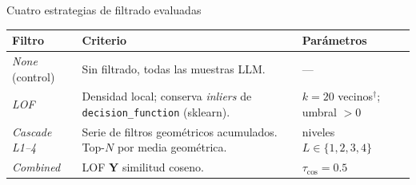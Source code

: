 \begin{frame}{Cuatro estrategias de filtrado evaluadas}
\small
\begin{tabular}{@{}p{2.6cm}p{4.6cm}p{4.6cm}@{}}
\toprule
\textbf{Filtro} & \textbf{Criterio} & \textbf{Parámetros} \\
\midrule
\textit{None} (control)        & Sin filtrado, todas las muestras LLM. & --- \\[2pt]
\textit{LOF}                   & Densidad local; conserva \emph{inliers} de \texttt{decision\_function} (sklearn). & $k=20$ vecinos$^{\dagger}$; umbral $>0$ \\[2pt]
\textit{Cascade L1--4} & Serie de filtros geométricos acumulados. Top-$N$ por media geométrica. & niveles $L\in\{1,2,3,4\}$ \\[2pt]
\textit{Combined}              & LOF \textbf{Y} similitud coseno. & $\tau_{\cos}=0.5$ \\
\bottomrule
\end{tabular}
\end{frame}

